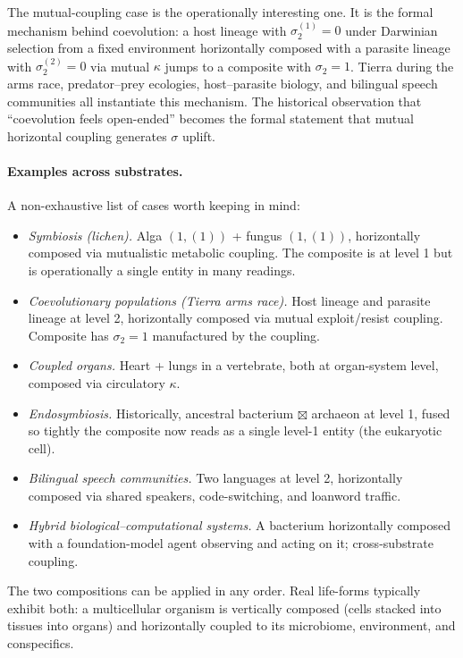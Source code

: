 \documentclass[journal]{IEEEtran}
\theoremstyle{plain}
\theoremstyle{definition}
\theoremstyle{plain}
\begin{document}
The mutual-coupling case is the operationally interesting one. It is
the formal mechanism behind coevolution: a host lineage with
$\sigma_2^{(1)} = 0$ under Darwinian selection from a fixed environment
horizontally composed with a parasite lineage with $\sigma_2^{(2)} = 0$
via mutual $\kappa$ jumps to a composite with $\sigma_2 = 1$. Tierra
during the arms race, predator--prey ecologies, host--parasite
biology, and bilingual speech communities all instantiate this
mechanism. The historical observation that ``coevolution feels
open-ended'' becomes the formal statement that mutual horizontal
coupling generates $\sigma$ uplift.

\paragraph{Examples across substrates.} A non-exhaustive list of cases
worth keeping in mind:

\begin{itemize}[leftmargin=1.5em,itemsep=2pt]
  \item \emph{Symbiosis (lichen).} Alga $(1, (1))$ + fungus $(1, (1))$,
    horizontally composed via mutualistic metabolic coupling. The
    composite is at level 1 but is operationally a single entity in
    many readings.
  \item \emph{Coevolutionary populations (Tierra arms race).} Host
    lineage and parasite lineage at level 2, horizontally composed via
    mutual exploit/resist coupling. Composite has $\sigma_2 = 1$
    manufactured by the coupling.
  \item \emph{Coupled organs.} Heart + lungs in a vertebrate, both at
    organ-system level, composed via circulatory $\kappa$.
  \item \emph{Endosymbiosis.} Historically, ancestral bacterium
    $\boxtimes$ archaeon at level 1, fused so tightly the composite
    now reads as a single level-1 entity (the eukaryotic cell).
  \item \emph{Bilingual speech communities.} Two languages at level 2,
    horizontally composed via shared speakers, code-switching, and
    loanword traffic.
  \item \emph{Hybrid biological--computational systems.} A bacterium
    horizontally composed with a foundation-model agent observing and
    acting on it; cross-substrate coupling.
\end{itemize}

The two compositions can be applied in any order. Real life-forms
typically exhibit both: a multicellular organism is vertically composed
(cells stacked into tissues into organs) and horizontally coupled to
its microbiome, environment, and conspecifics.
\end{document}
